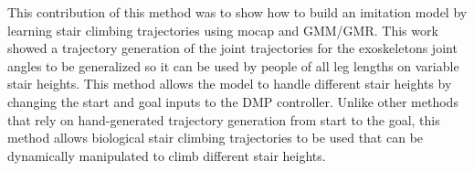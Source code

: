 This contribution of this method was to show how to build an imitation model by learning stair climbing trajectories using mocap and GMM/GMR. This work showed a trajectory generation of the joint trajectories for the exoskeletons joint angles to be generalized so it can be used by people of all leg lengths on variable stair heights. This method allows the model to handle different stair heights by changing the start and goal inputs to the DMP controller. Unlike other methods that rely on hand-generated trajectory generation from start to the goal, this method allows biological stair climbing trajectories to be used that can be dynamically manipulated to climb different stair heights.



